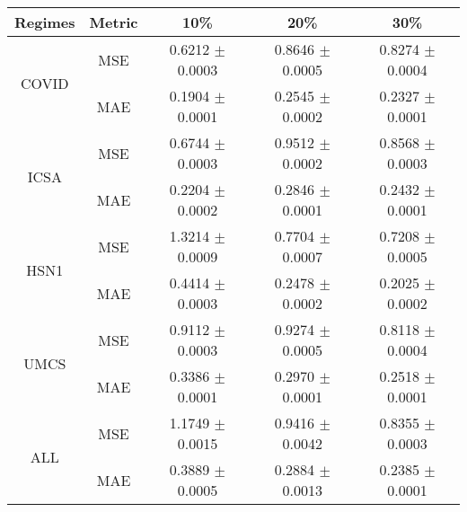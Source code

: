 {\begin{tabular}{ccccc}
\textbf{Regimes}                     & \textbf{Metric}                     & \textbf{10\%}       & \textbf{20\%}       & \textbf{30\%}       \\ \hline
\multirow{2}{*}{COVID}               & MSE                                 & 0.6212 $\pm$ 0.0003 & 0.8646 $\pm$ 0.0005 & 0.8274 $\pm$ 0.0004 \\
                                     & MAE                                 & 0.1904 $\pm$ 0.0001 & 0.2545 $\pm$ 0.0002 & 0.2327 $\pm$ 0.0001 \\ \hline
\multirow{2}{*}{ICSA}                & MSE                                 & 0.6744 $\pm$ 0.0003 & 0.9512 $\pm$ 0.0002 & 0.8568 $\pm$ 0.0003 \\
                                     & MAE                                 & 0.2204 $\pm$ 0.0002 & 0.2846 $\pm$ 0.0001 & 0.2432 $\pm$ 0.0001 \\ \hline
\multirow{2}{*}{HSN1}                & MSE                                 & 1.3214 $\pm$ 0.0009 & 0.7704 $\pm$ 0.0007 & 0.7208 $\pm$ 0.0005 \\
                                     & MAE                                 & 0.4414 $\pm$ 0.0003 & 0.2478 $\pm$ 0.0002 & 0.2025 $\pm$ 0.0002 \\ \hline
\multirow{2}{*}{UMCS}                & MSE                                 & 0.9112 $\pm$ 0.0003 & 0.9274 $\pm$ 0.0005 & 0.8118 $\pm$ 0.0004 \\
                                     & MAE                                 & 0.3386 $\pm$ 0.0001 & 0.2970 $\pm$ 0.0001 & 0.2518 $\pm$ 0.0001 \\ \hline
\multirow{2}{*}{ALL}                 & MSE                                 & 1.1749 $\pm$ 0.0015 & 0.9416 $\pm$ 0.0042 & 0.8355 $\pm$ 0.0003 \\
                                     & MAE                                 & 0.3889 $\pm$ 0.0005 & 0.2884 $\pm$ 0.0013 & 0.2385 $\pm$ 0.0001 \\ \hline
\end{tabular}}